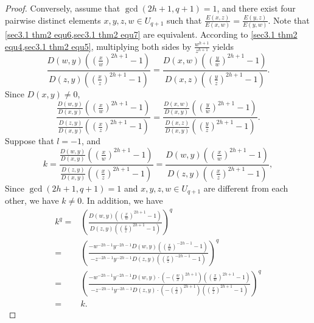 \documentclass[10pt]{article}%
\begin{document}
\begin{proof}
		 Conversely, assume that $\gcd(2h+1,q+1)=1$, and there exist four pairwise distinct elements $x,y,z,w\in U_{q+1}$ such that $\frac{E(x,z)}{E(x,w)}=\frac{E(y,z)}{E(y,w)}$. Note that \cref{sec3.1 thm2 equ6,sec3.1 thm2 equ7} are equivalent. According to \cref{sec3.1 thm2 equ4,sec3.1 thm2 equ5}, multiplying both sides by $\frac{w^{h+1}}{z^{h+1}}$ yields
		 \begin{equation*}
			\frac{D(w,y)\left(\left(\frac{x}{w}\right)^{2h+1}-1\right)}{D(z,y)\left(\left(\frac{x}{z}\right)^{2h+1}-1\right)}=\frac{D(x,w)\left(\left(\frac{y}{w}\right)^{2h+1}-1\right)}{D(x,z)\left(\left(\frac{y}{z}\right)^{2h+1}-1\right)}.
		 \end{equation*}
		 Since $D(x,y)\ne0$, 
		 \begin{equation}\label{sec3.1 thm2 equ8}
		 	\frac{\frac{D(w,y)}{D(x,y)}\left(\left(\frac{x}{w}\right)^{2h+1}-1\right)}{\frac{D(z,y)}{D(x,y)}\left(\left(\frac{x}{z}\right)^{2h+1}-1\right)}=\frac{\frac{D(x,w)}{D(x,y)}\left(\left(\frac{y}{w}\right)^{2h+1}-1\right)}{\frac{D(x,z)}{D(x,y)}\left(\left(\frac{y}{z}\right)^{2h+1}-1\right)}.
		 \end{equation}
		 Suppose that $l=-1$, and 
		 \begin{equation*}
		 	k=\frac{\frac{D(w,y)}{D(x,y)}\left(\left(\frac{x}{w}\right)^{2h+1}-1\right)}{\frac{D(z,y)}{D(x,y)}\left(\left(\frac{x}{z}\right)^{2h+1}-1\right)}=\frac{D(w,y)\left(\left(\frac{x}{w}\right)^{2h+1}-1\right)}{D(z,y)\left(\left(\frac{x}{z}\right)^{2h+1}-1\right)},
		 \end{equation*}
		 Since $\gcd(2h+1,q+1)=1$ and $x,y,z,w\in U_{q+1}$ are different from each other, we have $k\ne0$. In addition, we have
		 \begin{equation*}
		 	\begin{aligned}
		 		k^q=&\left(\frac{D(w,y)\left(\left(\frac{x}{w}\right)^{2h+1}-1\right)}{D(z,y)\left(\left(\frac{x}{z}\right)^{2h+1}-1\right)}\right)^q\\
		 		=&\left(\frac{-w^{-2h-1}y^{-2h-1}D(w,y)\left(\left(\frac{x}{w}\right)^{-2h-1}-1\right)}{-z^{-2h-1}y^{-2h-1}D(z,y)\left(\left(\frac{x}{z}\right)^{-2h-1}-1\right)}\right)^q\\
		 		=&\left(\frac{-w^{-2h-1}y^{-2h-1}D(w,y)\cdot\left(-\left(\frac{w}{x}\right)^{2h+1}\right)\left(\left(\frac{x}{w}\right)^{2h+1}-1\right)}{-z^{-2h-1}y^{-2h-1}D(z,y)\cdot\left(-\left(\frac{z}{x}\right)^{2h+1}\right)\left(\left(\frac{x}{z}\right)^{2h+1}-1\right)}\right)^q\\
		 		=&k.
		 	\end{aligned}

\end{equation*}
\end{proof}
\end{document}
